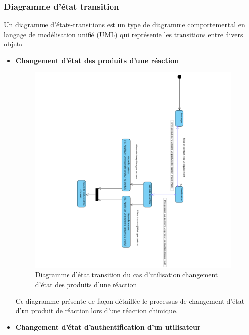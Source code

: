 \subsubsection{Diagramme d’état transition}

Un diagramme d'états-transitions est un type de diagramme comportemental en langage de modélisation unifié (UML) qui représente les transitions entre divers objets.

\begin{itemize}
	\item \textbf{Changement d’état des produits d’une réaction}

	      \begin{figure}[H]
		      \centering
		      \includegraphics[width=1\textwidth]{img/etdR}
		      \caption{Diagramme d’état transition du cas d'utilisation changement d’état des produits d’une réaction}
		      \label{fig:mesh1}
	      \end{figure}

	      Ce diagramme présente de façon détaillée le processus de changement d’état d’un produit de réaction lors d’une réaction chimique.

	\item \textbf{Changement d’état d'authentification d’un utilisateur }


\end{itemize}
